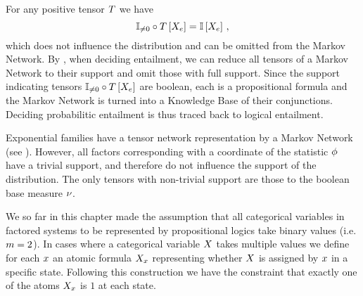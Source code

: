 For any positive tensor $T$ we have
	\[ \mathbb{I}_{\neq0}\circ T\left[X_{e}\right] = \mathbb{I}\left[X_{e}\right] \, , \]
which does not influence the distribution and can be omitted from the Markov Network.
By , when deciding entailment, we can reduce all tensors of a Markov Network to their support and omit those with full support.
Since the support indicating tensors $\mathbb{I}_{\neq0}\circ T\left[X_{e}\right]$ are boolean, each is a propositional formula and the Markov Network is turned into a Knowledge Base of their conjunctions.
Deciding probabilitic entailment is thus traced back to logical entailment.

Exponential families have a tensor network representation by a Markov Network (see ).
However, all factors corresponding with a coordinate of the statistic $\phi$ have a trivial support, and therefore do not influence the support of the distribution.
The only tensors with non-trivial support are those to the boolean base measure $\nu$.


\label{sec:categoricalTN}

We so far in this chapter made the assumption that all categorical variables in factored systems to be represented by propositional logics take binary values (i.e. $m=2$).
In cases where a categorical variable $X$ takes multiple values we define for each $x$ an atomic formula $X_{x}$ representing whether $X$ is assigned by $x$ in a specific state.
Following this construction we have the constraint that exactly one of the atoms $X_{x}$ is $1$ at each state.



